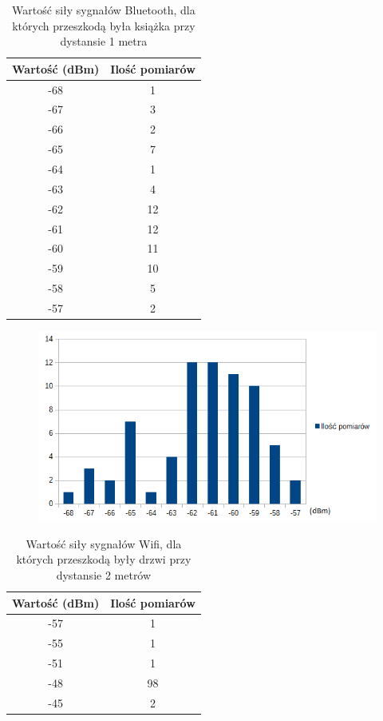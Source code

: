 \begin{table}[H]
	\caption {Wartość siły sygnałów Bluetooth, dla których przeszkodą była książka przy dystansie 1 metra}
\begin{center}
		\begin{tabular}{|c|c|}
			\hline
			Wartość (dBm) & Ilość pomiarów \\ 
			\hline
			-68 & 1\\
			\hline
			-67 & 3\\
			\hline
			-66 & 2\\
			\hline
			-65 & 7\\
			\hline
			-64 & 1\\
			\hline
			-63 & 4\\
			\hline
			-62 & 12\\
			\hline
			-61 & 12\\
			\hline
			-60 & 11\\
			\hline
			-59 & 10\\
			\hline
			-58 & 5\\
			\hline
			-57 & 2\\
			\hline
		\end{tabular}
\end{center}
\end{table}
\begin{figure}[H]			
\centering
\includegraphics[width=1.0\textwidth]{wykres_bluetooth_2}
\end{figure}
\begin{table}[H]
	\caption {Wartość siły sygnałów Wifi, dla których przeszkodą były drzwi przy dystansie 2 metrów}
\begin{center}
		\begin{tabular}{|c|c|}
			\hline
			Wartość (dBm) & Ilość pomiarów \\ 
			\hline
			-57 & 1\\
			\hline
			-55 & 1\\
			\hline
			-51 & 1\\
			\hline
			-48 & 98\\
			\hline
			-45 & 2\\
			\hline
		\end{tabular}
\end{center}
\end{table}
